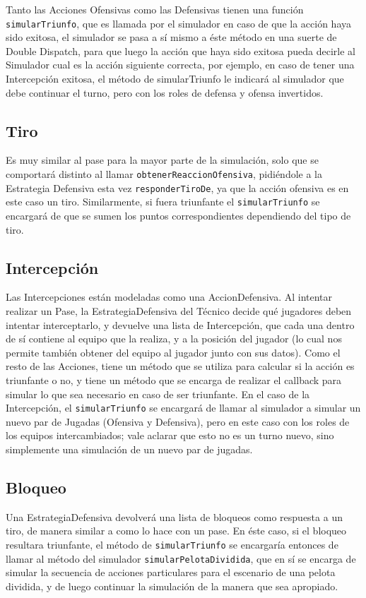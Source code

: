 Tanto las Acciones Ofensivas como las Defensivas tienen una función \texttt{simularTriunfo}, que es llamada por el simulador en caso de que la acción haya sido exitosa, el simulador se pasa a sí mismo a éste método en una suerte de Double Dispatch, para que luego la acción que haya sido exitosa pueda decirle al Simulador cual es la acción siguiente correcta, por ejemplo, en caso de tener una Intercepción exitosa, el método de simularTriunfo le indicará al simulador que debe continuar el turno, pero con los roles de defensa y ofensa invertidos.


\subsection{Tiro}

Es muy similar al pase para la mayor parte de la simulación, solo que se comportará distinto al llamar \texttt{obtenerReaccionOfensiva}, pidiéndole a la Estrategia Defensiva esta vez \texttt{responderTiroDe}, ya que la acción ofensiva es en este caso un tiro. Similarmente, si fuera triunfante el \texttt{simularTriunfo} se encargará de que se sumen los puntos correspondientes dependiendo del tipo de tiro.

\subsection{Intercepción}
Las Intercepciones están modeladas como una AccionDefensiva. Al intentar realizar un Pase, la EstrategiaDefensiva del Técnico decide qué jugadores deben intentar interceptarlo, y devuelve una lista de Intercepción, que cada una dentro de sí contiene al equipo que la realiza, y a la posición del jugador (lo cual nos permite también obtener del equipo al jugador junto con sus datos). Como el resto de las Acciones, tiene un método que se utiliza para calcular si la acción es triunfante o no, y tiene un método que se encarga de realizar el callback para simular lo que sea necesario en caso de ser triunfante. En el caso de la Intercepción, el \texttt{simularTriunfo} se encargará de llamar al simulador a simular un nuevo par de Jugadas (Ofensiva y Defensiva), pero en este caso con los roles de los equipos intercambiados; vale aclarar que esto no es un turno nuevo, sino simplemente una simulación de un nuevo par de jugadas.

\subsection{Bloqueo}
Una EstrategiaDefensiva devolverá una lista de bloqueos como respuesta a un tiro, de manera similar a como lo hace con un pase. En éste caso, si el bloqueo resultara triunfante, el método de \texttt{simularTriunfo} se encargaría entonces de llamar al método del simulador \texttt{simularPelotaDividida}, que en sí se encarga de simular la secuencia de acciones particulares para el escenario de una pelota dividida, y de luego continuar la simulación de la manera que sea apropiado.


